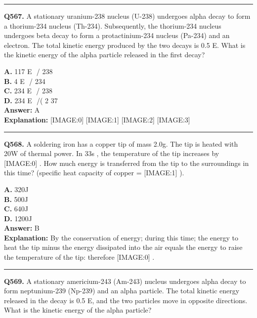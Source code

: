 \documentclass[12pt]{article}
\begin{document}
\hrule
\vspace{1em}


\noindent
\textbf{Q567.} A stationary uranium-238 nucleus (U-238) undergoes alpha decay to form a thorium-234 nucleus (Th-234). Subsequently, the thorium-234 nucleus undergoes beta decay to form a protactinium-234 nucleus (Pa-234) and an electron. The total kinetic energy produced by the two decays is
0.5
E. What is the kinetic energy of the alpha particle released in the first decay?



\textbf{A.} 117
E
​
/
238 \\
\textbf{B.} 4
E
​
/
234 \\
\textbf{C.} 234
E
​
/
238 \\
\textbf{D.} 234
E
​
/(
2
37 \\

\textbf{Answer:} A \\
\textbf{Explanation:} [IMAGE:0]
[IMAGE:1]
[IMAGE:2]
[IMAGE:3]

\hrule
\vspace{1em}


\noindent
\textbf{Q568.} A soldering iron has a copper tip of mass 2.0g.
The tip is heated with 20W
of thermal power. In 33s
, the temperature of the tip increases by
[IMAGE:0]
.
How much energy is transferred from the tip to the surroundings in this time? (specific heat capacity of copper =
[IMAGE:1]
).



\textbf{A.} 320J \\
\textbf{B.} 500J \\
\textbf{C.} 640J \\
\textbf{D.} 1200J \\

\textbf{Answer:} B \\
\textbf{Explanation:} By the conservation of energy; during this time; the energy to heat the tip minus the energy dissipated into the air equals the energy to raise the temperature of the tip: therefore
[IMAGE:0]
.

\hrule
\vspace{1em}


\noindent
\textbf{Q569.} A stationary americium-243 (Am-243) nucleus undergoes alpha decay to form neptunium-239 (Np-239) and an alpha particle. The total kinetic energy released in the decay is
0.5
E, and the two particles move in opposite directions. What is the kinetic energy of the alpha particle?
\end{document}
